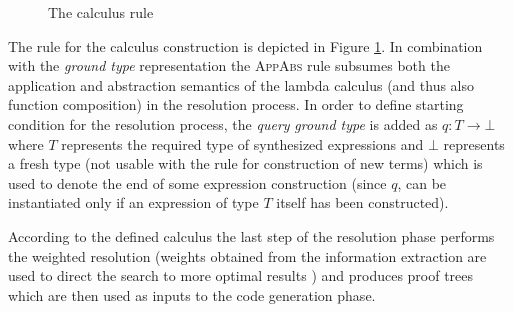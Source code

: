 \begin{figure}[ht]
\vspace{2mm}
\caption{The calculus rule}
\label{fig:appabs_rule}
\end{figure}

The rule for the calculus construction is depicted in Figure \ref{fig:appabs_rule}.
In combination with the \textit{ground type} representation the \textsc{AppAbs} rule subsumes both the application and abstraction semantics of the lambda calculus (and thus also function composition) in the resolution process.
In order to define starting condition for the resolution process, the \textit{query} \textit{ground type} is added as $q:T \rightarrow \bot$ where $T$ represents the required type of synthesized expressions and $\bot$ represents a fresh type (not usable with the rule for construction of new terms) which is used to denote the end of some expression construction (since $q$, can be instantiated only if an expression of type $T$ itself has been constructed). 

According to the defined calculus the last step of the resolution phase performs the weighted resolution (weights obtained from the information extraction are used to direct the search to more optimal results \cite{EPFL-REPORT-170040}) and produces proof trees which are then used as inputs to the code generation phase. 